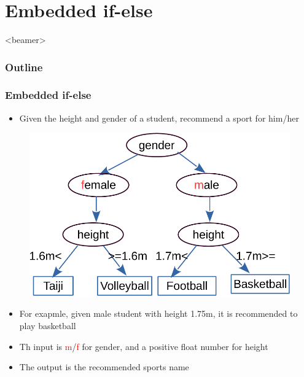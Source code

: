 %

\section{Embedded if-else}
\label{sec:if1}
\begin{frame}<beamer>
    \frametitle{Outline}
    \tableofcontents[currentsection]
\end{frame}

\begin{frame}
\frametitle{Embedded if-else}
\vspace{-0.1in}
\begin{itemize}
	\item {Given the height and gender of a student, recommend a sport for him/her}
\end{itemize}
\begin{figure}
	\begin{center}
		\includegraphics[width=0.45\linewidth]{figs/sports.pdf}
	\end{center}
\end{figure}
\begin{itemize}
	\item {For exapmle, given male student with height 1.75m, it is recommended to play basketball}
	\item {Th input is \textcolor{red}{m}/\textcolor{red}{f} for gender, and a positive float number for height}
	\item {The output is the recommended sports name}
\end{itemize}
\end{frame}


